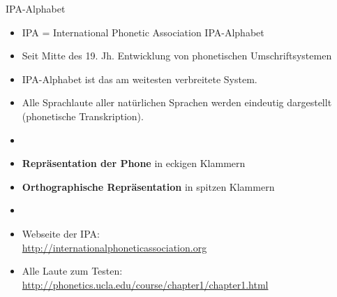 
\begin{frame}{IPA-Alphabet}

	\begin{itemize}
		\item IPA = International Phonetic Association \ras IPA-Alphabet
		\item Seit Mitte des 19. Jh. \ras Entwicklung von phonetischen Umschriftsystemen
		\item IPA-Alphabet ist das am weitesten verbreitete System.
		\item Alle Sprachlaute aller natürlichen Sprachen werden eindeutig dargestellt (phonetische Transkription).
		\item[]
		\item \textbf{Repräsentation der Phone} \ras in eckigen Klammern \gqq{\textipa{[ ]}}
		\item \textbf{Orthographische Repräsentation} \ras in spitzen Klammern \gqq{$\langle{} \rangle{}$}
		\item[]
		\item {Webseite der IPA}:\\ \url{http://internationalphoneticassociation.org}
		\item {Alle Laute zum Testen}: \url{http://phonetics.ucla.edu/course/chapter1/chapter1.html}
	\end{itemize}
	
\end{frame}



%
%		
%	

